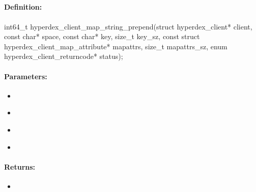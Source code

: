 \pagebreak
\subsection{}
\label{api:c:map_string_prepend}


\paragraph{Definition:}
\begin{ccode}
int64_t hyperdex_client_map_string_prepend(struct hyperdex_client* client,
        const char* space,
        const char* key, size_t key_sz,
        const struct hyperdex_client_map_attribute* mapattrs, size_t mapattrs_sz,
        enum hyperdex_client_returncode* status);
\end{ccode}

\paragraph{Parameters:}
\begin{itemize}[noitemsep]
\item {}\\

\item {}\\

\item {}\\

\item {}\\

\end{itemize}

\paragraph{Returns:}
\begin{itemize}[noitemsep]
\item {}\\

\end{itemize}

